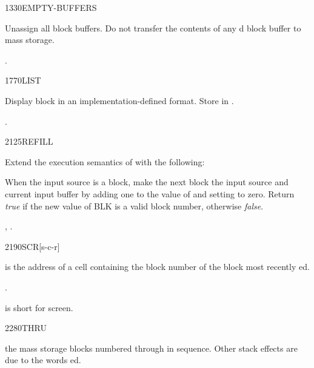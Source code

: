 \begin{worddef}{1330}{EMPTY-BUFFERS}
\item \stack{}{}

	Unassign all block buffers. Do not transfer the contents of
	any d block buffer to mass storage.

\see {}.
\end{worddef}


\begin{worddef}{1770}{LIST}
\item {}

	Display block  in an implementation-defined format.
	Store  in .

\see {}.
\end{worddef}


\begin{worddef}{2125}{REFILL}
\item {}

	Extend the execution semantics of 
	with the following:

	When the input source is a block, make the next block the input
	source and current input buffer by adding one to the value of
	 and setting  to zero. Return
	\emph{true} if the new value of BLK is a valid block number,
	otherwise \emph{false}.

\see {},
	.
\end{worddef}


\begin{worddef}{2190}{SCR}[s-c-r]
\item {}

	 is the address of a cell containing the block
	number of the block most recently ed.

\see {}.

	\begin{rationale} %
		 is short for screen.
	\end{rationale}
\end{worddef}


\begin{worddef}{2280}{THRU}
\item {}

	 the mass storage blocks numbered  through
	 in sequence. Other stack effects are due to the words
	ed.
\end{worddef}



